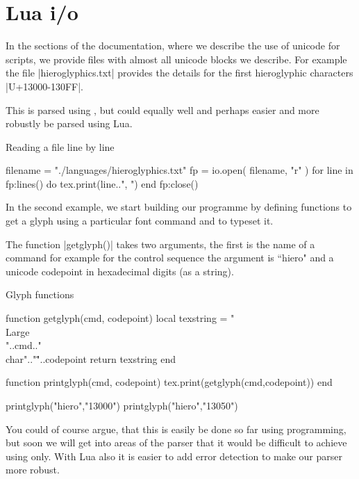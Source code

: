 \chapter{Lua i/o}
\newfontfamily{}

In the sections of the documentation, where we describe
the use of unicode for scripts, we provide files with almost
all unicode blocks we describe. For example the file
|hieroglyphics.txt| provides the details for the first
hieroglyphic characters |U+13000-130FF|.

This is parsed using \tex, but could equally well and perhaps easier and more robustly be parsed using Lua.  


\begin{texexample}{Reading a file line by line}{}
\begin{luacode*}
filename = "./languages/hieroglyphics.txt"
fp = io.open( filename, "r" )
for line in fp:lines() do
    tex.print(line..", ")
   end
fp:close()
\end{luacode*}
\end{texexample}

In the second example, we start building our programme
by defining functions to get a glyph using a particular font
command and to typeset it.

The function |getglyph()| takes two arguments, the first is the
name of a command for example for the control sequence \cmd{\hiero} the argument is  ``hiero" and a unicode codepoint in hexadecimal digits (as a string).

\begin{texexample}{Glyph functions}{}
\begin{luacode*}
function getglyph(cmd, codepoint)
  local texstring = "\\Large\\"..cmd.." \\char".."\""..codepoint
  return texstring
end

function printglyph(cmd, codepoint)
  tex.print(getglyph(cmd,codepoint))
end

printglyph("hiero","13000")
printglyph("hiero","13050")
\end{luacode*}
\end{texexample}

You could of course argue, that this is easily be done so far using \tex programming, but soon we will get into areas of the parser that it would be difficult to achieve using \tex only. With Lua also it is easier to add error detection to make our parser more robust.


